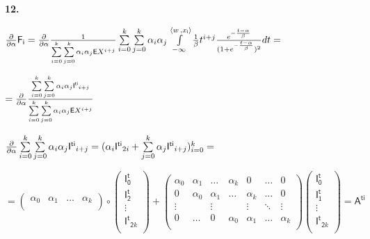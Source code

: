 \documentclass[a4paper,12pt]{article}
\begin{document}
\noindent\textbf{12.}

\begin{center}
    ${\partial\over{\partial \alpha}} \mathsf{F_i} = {\partial\over{\partial \alpha}} {1\over{\sum\limits_{i = 0}^k}\sum\limits_{j=0}^k\alpha_i \alpha_j \mathsf{E}X^{i + j}} \sum\limits_{i = 0}^k \sum\limits_{j = 0}^k \alpha_i \alpha_j \int\limits_{-\infty}^{\langle w \,, x_{\mathsf{i}}\rangle} {1\over{\beta}} t^{i + j} {e^{-{t - \alpha\over{\beta}}}\over{(1 + e^{-{t - \alpha\over{\beta}}}})^2} d t = $
\end{center}

\begin{center}
    $= {\partial\over{\partial \alpha}} {\sum\limits_{i = 0}^k \sum\limits_{j = 0}^k \alpha_i \alpha_j \mathsf{I^{ti}}_{i + j}\over{\sum\limits_{i = 0}^k}\sum\limits_{j=0}^k\alpha_i \alpha_j \mathsf{E}X^{i + j}} $
\end{center}

\begin{center}
    ${\partial\over{\partial \alpha}} \sum\limits_{i = 0}^k \sum\limits_{j = 0}^k \alpha_i \alpha_j \mathsf{I^{ti}}_{i + j} = (\alpha_i\mathsf{I^{ti}}_{2i} + \sum\limits_{j = 0}^k \alpha_j \mathsf{I^{ti}}_{i + j})_{i = 0}^k =$
\end{center}

\begin{displaymath}
    = \begin{pmatrix}
        \alpha_0 & \alpha_1 & \ldots & \alpha_k \\
    \end{pmatrix} \circ \begin{pmatrix}
        \mathsf{I^t_{0}} \\ \mathsf{I^t_{2}} \\ \vdots \\ \mathsf{I^t}_{\mathsf{2}k} \\
    \end{pmatrix} + \begin{pmatrix}
        \alpha_0 & \alpha_1 & \ldots & \alpha_k & 0 & \ldots & 0 \\
        0 & \alpha_0 & \alpha_1 & \ldots & \alpha_k & \ldots & 0 \\
        \vdots &  & \vdots &  & \vdots & \ddots & \vdots\\
        0 & \ldots & 0 & \alpha_0 & \alpha_1 &\ldots & \alpha_k \\
    \end{pmatrix} \begin{pmatrix}
        \mathsf{I^t_0} \\ \mathsf{I^t_1} \\ \vdots \\ \mathsf{I^t}_{\mathsf{2}k} \\
    \end{pmatrix} = \mathsf{A^{ti}}
\end{displaymath}
\end{document}
